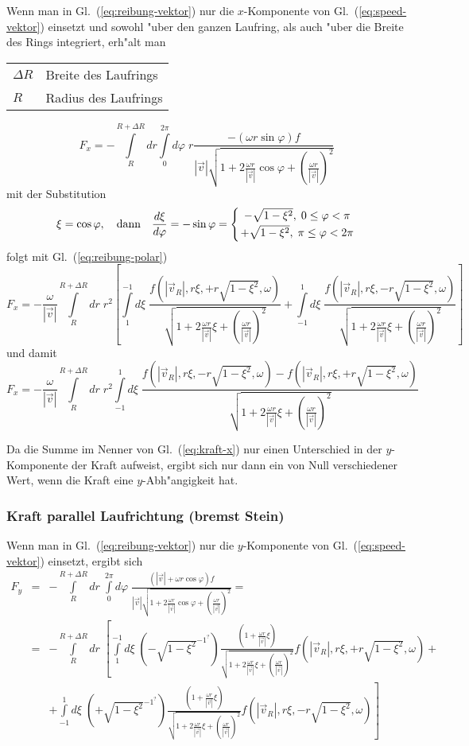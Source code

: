 \documentclass[a4paper]{report}
\newcommand{\eqlab}[1]{\label{eq:#1}}
\newcommand{\eqref}[1]{Gl.~(\ref{eq:#1})}
\newcommand{\vRo}{ \vec{v}   }   %
\newcommand{\vRi}{ \vec{v}_R }   %
\newcommand{\vRiAbsDivvRoCOS}[1]{\sqrt{\displaystyle
    1 + 2\frac{\omega #1}{|\vRo|}\cos\varphi +
    \left( \frac{\omega #1}{|\vRo|} \right)^2 } }
\newcommand{\vRiAbsDivvRoXI}[1]{\sqrt{\displaystyle
    1 + 2\frac{\omega #1}{|\vRo|}\xi +
    \left( \frac{\omega #1}{|\vRo|} \right)^2 } }
\newcommand{\SubstCos}{ \sqrt{1-\xi^2} }
\newcommand{\fpolar}[2]{ f( |\vRi| , #2 \xi, #1 #2 \SubstCos ,\omega) }
\newcommand{\Int}{\int\limits}
\begin{document}
Wenn man in \eqref{reibung-vektor} nur die $ x $-Komponente von
\eqref{speed-vektor} einsetzt und sowohl "uber den ganzen Laufring, als auch
"uber die Breite des Rings integriert, erh"alt man

\begin{tabular}{@{}ll}
$ \Delta R $	  & Breite des Laufrings \\
$ R $		  & Radius des Laufrings
\end{tabular}

\begin{equation}
F_x = - \Int_{R}^{R+\Delta R} dr \Int_{0}^{2\pi} d\varphi\; r
\frac{-( \omega r \sin\varphi ) f}{|\vRo| \vRiAbsDivvRoCOS{r} }
\end{equation}
%
mit der Substitution
%
\begin{equation}
\xi = \cos\varphi, \quad \textrm{dann}\quad \frac{d\xi}{d\varphi} = -\sin\varphi =
\left\{ {- \SubstCos , \; 0	\leq\varphi < \pi \atop
	 + \SubstCos , \; \pi\leq\varphi < 2\pi }\right.
	  \eqlab{substitution}
\end{equation}
%
folgt mit \eqref{reibung-polar}
%
\begin{equation}
F_x = -\frac{\omega}{|\vRo|} \Int_{R}^{R+\Delta R} dr \; r^2 \left[
\Int_{1}^{-1} d\xi\;\frac{\fpolar{+}{r}}{ \vRiAbsDivvRoXI{r} } +
\Int_{-1}^{1} d\xi\;\frac{\fpolar{-}{r}}{ \vRiAbsDivvRoXI{r} } \right]
\end{equation}
%
und damit
%
\begin{equation}
F_x = -\frac{\omega}{|\vRo|} \Int_{R}^{R+\Delta R} dr\;r^2
\Int_{-1}^{1} d\xi\;\frac{\fpolar{-}{r}-\fpolar{+}{r}}{ \vRiAbsDivvRoXI{r} }
\eqlab{kraft-x}
\end{equation}

Da die Summe im Nenner von \eqref{kraft-x} nur einen Unterschied in der
$ y $-Komponente der Kraft aufweist, ergibt sich nur dann ein von Null
verschiedener Wert, wenn die Kraft eine $ y $-Abh"angigkeit hat.

\subsubsection{Kraft parallel Laufrichtung (bremst Stein)}

Wenn man in \eqref{reibung-vektor} nur die $ y $-Komponente von
\eqref{speed-vektor} einsetzt, ergibt sich
%
\begin{eqnarray}
F_y &=& -\Int_{R}^{R+\Delta R} dr \; \Int_{0}^{2\pi} d\varphi\; %
\frac{ (|\vRo|+\omega r\cos\varphi) f }{ |\vRo| \vRiAbsDivvRoCOS{r}  } =		      \\
&=& -\Int_{R}^{R+\Delta R}dr\;\left[
    \Int_{1}^{-1}d\xi\; (-  \SubstCos^{-1^?})
        \frac{\left(1+\frac{\omega r}{|\vRo|}\xi\right)
             }{ \vRiAbsDivvRoXI{r} } \fpolar{+}{r} +
    \right.
\nonumber\\&&
    +\left.\Int_{-1}^{1}d\xi\; (+  \SubstCos^{-1^?})
        \frac{ \left( 1+\frac{\omega r}{|\vRo|}\xi \right)
             }{ \vRiAbsDivvRoXI{r}  } \fpolar{-}{r}
        \right]
\end{eqnarray}
\end{document}
